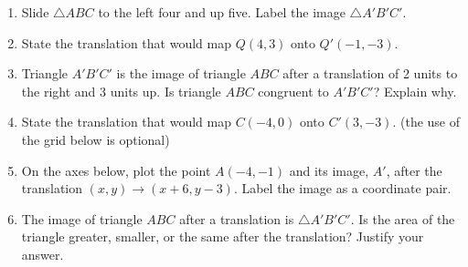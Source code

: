 \documentclass[12pt, twoside]{article}
\begin{document}
\begin{enumerate}
\newpage
\item Slide $\triangle ABC$ to the left four and up five. Label the image $\triangle A'B'C'$.
  \begin{center}
  \end{center}
 
\item State the translation that would map $Q(4,3)$ onto $Q'(-1,-3)$. \vspace{2cm}

\item Triangle $A'B'C'$ is the image of triangle $ABC$ after a translation of 2 units to the right and 3 units up. Is triangle $ABC$ congruent to $A'B'C'$? Explain why. \vspace{3cm}
 
\item State the translation that would map $C(-4,0)$ onto $C'(3,-3)$. (the use of the grid below is optional)
\begin{center}
\end{center}

\item On the axes below, plot the point $A(-4,-1)$ and its image, $A'$, after the translation $(x,y) \rightarrow (x+6,y-3)$. Label the image as a coordinate pair.
    \begin{center}
  \end{center}

  \item The image of triangle $ABC$ after a translation is $\triangle A'B'C'$. Is the area of the triangle greater, smaller, or the same after the translation? Justify your answer. \vspace{3cm}


\end{enumerate}
\end{document}
